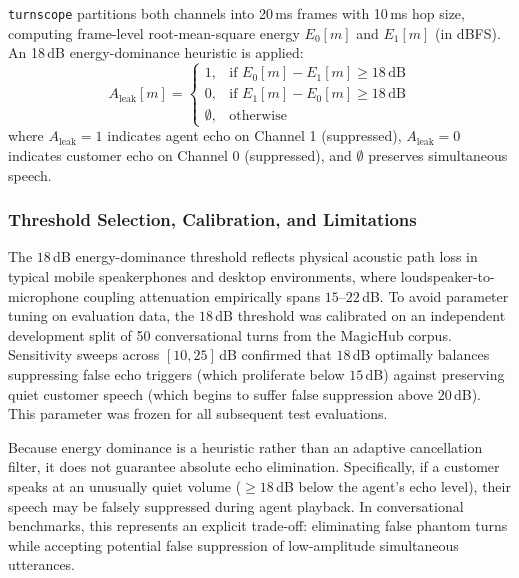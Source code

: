 \documentclass[10pt,journal,compsoc]{IEEEtran}
\begin{document}
\texttt{turnscope} partitions both channels into 20\,ms frames with 10\,ms hop size, computing frame-level root-mean-square energy $E_0[m]$ and $E_1[m]$ (in dBFS). An 18\,dB energy-dominance heuristic is applied:
\begin{equation}
A_{\text{leak}}[m] = 
\begin{cases}
1, & \text{if } E_0[m] - E_1[m] \ge 18\,\text{dB} \\
0, & \text{if } E_1[m] - E_0[m] \ge 18\,\text{dB} \\
\emptyset, & \text{otherwise}
\end{cases}
\end{equation}
where $A_{\text{leak}} = 1$ indicates agent echo on Channel 1 (suppressed), $A_{\text{leak}} = 0$ indicates customer echo on Channel 0 (suppressed), and $\emptyset$ preserves simultaneous speech.

\subsubsection{Threshold Selection, Calibration, and Limitations}
The $18$\,dB energy-dominance threshold reflects physical acoustic path loss in typical mobile speakerphones and desktop environments, where loudspeaker-to-microphone coupling attenuation empirically spans $15$--$22$\,dB. To avoid parameter tuning on evaluation data, the $18$\,dB threshold was calibrated on an independent development split of 50 conversational turns from the MagicHub corpus. Sensitivity sweeps across $[10, 25]$\,dB confirmed that $18$\,dB optimally balances suppressing false echo triggers (which proliferate below $15$\,dB) against preserving quiet customer speech (which begins to suffer false suppression above $20$\,dB). This parameter was frozen for all subsequent test evaluations.

Because energy dominance is a heuristic rather than an adaptive cancellation filter, it does not guarantee absolute echo elimination. Specifically, if a customer speaks at an unusually quiet volume ($\ge 18$\,dB below the agent's echo level), their speech may be falsely suppressed during agent playback. In conversational benchmarks, this represents an explicit trade-off: eliminating false phantom turns while accepting potential false suppression of low-amplitude simultaneous utterances.
\end{document}
